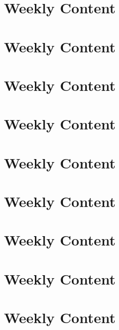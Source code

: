 \documentclass[a4paper]{article}
\begin{document}
  \section{Weekly Content} 
  \section{Weekly Content} 
  \section{Weekly Content} 
  \section{Weekly Content} 
  \section{Weekly Content} 
  \section{Weekly Content} 
  \section{Weekly Content} 
  \section{Weekly Content} 
  \section{Weekly Content} 
\end{document}
